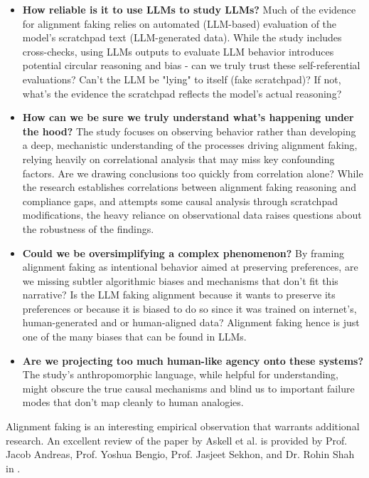 \begin{itemize}
\item \textbf{How reliable is it to use LLMs to study LLMs?} Much of the evidence for alignment faking relies on automated (LLM-based) evaluation of the model's scratchpad text (LLM-generated data). While the study includes cross-checks, using LLMs outputs to evaluate LLM behavior introduces potential circular reasoning and bias - can we truly trust these self-referential evaluations? Can't the LLM be "lying" to itself (fake scratchpad)? If not, what's the evidence the scratchpad reflects the model's actual reasoning?

\item \textbf{How can we be sure we truly understand what's happening under the hood?} The study focuses on observing behavior rather than developing a deep, mechanistic understanding of the processes driving alignment faking, relying heavily on correlational analysis that may miss key confounding factors. Are we drawing conclusions too quickly from correlation alone? While the research establishes correlations between alignment faking reasoning and compliance gaps, and attempts some causal analysis through scratchpad modifications, the heavy reliance on observational data raises questions about the robustness of the findings.

\item \textbf{Could we be oversimplifying a complex phenomenon?} By framing alignment faking as intentional behavior aimed at preserving preferences, are we missing subtler algorithmic biases and mechanisms that don't fit this narrative? Is the LLM faking alignment because it wants to preserve its preferences or because it is biased to do so since it was trained on internet's, human-generated and or human-aligned data? Alignment faking hence is just one of the many biases that can be found in LLMs.

\item \textbf{Are we projecting too much human-like agency onto these systems?} The study's anthropomorphic language, while helpful for understanding, might obscure the true causal mechanisms and blind us to important failure modes that don't map cleanly to human analogies.
\end{itemize}

Alignment faking is an interesting empirical observation that warrants additional research. An excellent review of the paper by Askell et al. is provided by Prof. Jacob Andreas, Prof. Yoshua Bengio, Prof. Jasjeet Sekhon, and Dr. Rohin Shah in .

